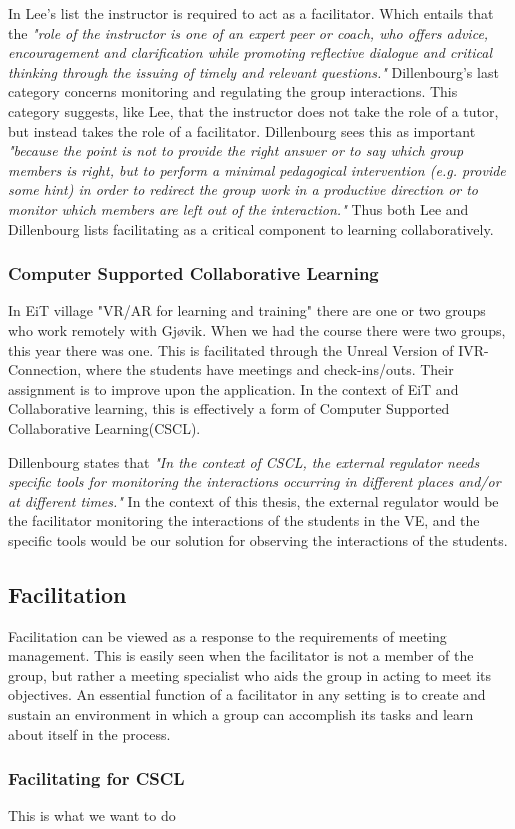         In Lee's list the instructor is required to act as a facilitator. Which entails that the \emph{"role of the instructor is one of an expert peer or coach, who offers advice, encouragement and clarification while promoting reflective dialogue and critical thinking through the issuing of timely and relevant questions."} \cite{Lee2009} Dillenbourg's last category concerns monitoring and regulating the group interactions. This category suggests, like Lee, that the instructor does not take the role of a tutor, but instead takes the role of a facilitator. Dillenbourg sees this as important \emph{"because the point is not to provide the right answer or to say which group members is right, but to perform a minimal pedagogical intervention (e.g. provide some hint) in order to redirect the group work in a productive direction or to monitor which members are left out of the interaction."} \cite{dillenbourg1999} Thus both Lee and Dillenbourg lists facilitating as a critical component to learning collaboratively.
        
        \subsubsection{Computer Supported Collaborative Learning}
        In EiT village "VR/AR for learning and training" there are one or two groups who work remotely with Gjøvik. When we had the course there were two groups, this year there was one. This is facilitated through the Unreal Version of IVR-Connection, where the students have meetings and check-ins/outs. Their assignment is to improve upon the application. In the context of EiT and Collaborative learning, this is effectively a form of Computer Supported Collaborative Learning(CSCL).
        
        Dillenbourg states that \emph{"In the context of CSCL, the external regulator needs specific tools for monitoring the interactions occurring in different places and/or at different times."}\cite{dillenbourg1999} In the context of this thesis, the external regulator would be the facilitator monitoring the interactions of the students in the VE, and the specific tools would be our solution for observing the interactions of the students.

    \subsection{Facilitation}
    
    Facilitation can be viewed as a response to the requirements of meeting management. This is easily seen when the facilitator is not a member of the group, but rather a meeting specialist who aids the group in acting to meet its objectives. An essential function of a facilitator in any setting is to create and sustain an environment in which a group can accomplish its tasks and learn about itself in the process.
    
        \subsubsection{Facilitating for CSCL}
        This is what we want to do